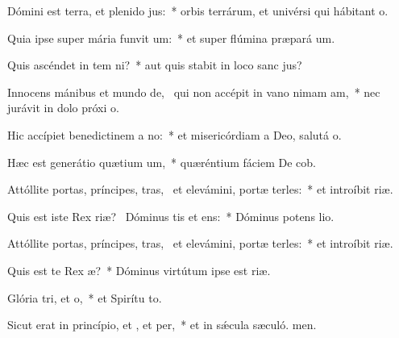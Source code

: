 \item Dómini est terra, et plenido jus:~* orbis terrárum, et univérsi qui hábitant  o.
\item Quia ipse super mária funvit um:~* et super flúmina præpará um.
\item Quis ascéndet in tem ni?~* aut quis stabit in loco sanc jus?
\item Innocens mánibus et mundo de,~\pscross{} qui non accépit in vano nimam am,~* nec jurávit in dolo próxi o.
\item Hic accípiet benedictinem a no:~* et misericórdiam a Deo, salutá o.
\item Hæc est generátio quætium um,~* quæréntium fáciem De cob.
\item Attóllite portas, príncipes, tras,~\pscross{} et elevámini, portæ terles:~* et introíbit  riæ.
\item Quis est iste Rex riæ?~\pscross{} Dóminus tis et ens:~* Dóminus potens  lio.
\item Attóllite portas, príncipes, tras,~\pscross{} et elevámini, portæ terles:~* et introíbit  riæ.
\item Quis est te Rex æ?~* Dóminus virtútum ipse est  riæ.
\item Glória tri, et o,~* et Spirítu to.
\item Sicut erat in princípio, et , et per,~* et in sǽcula sæculó. men.
